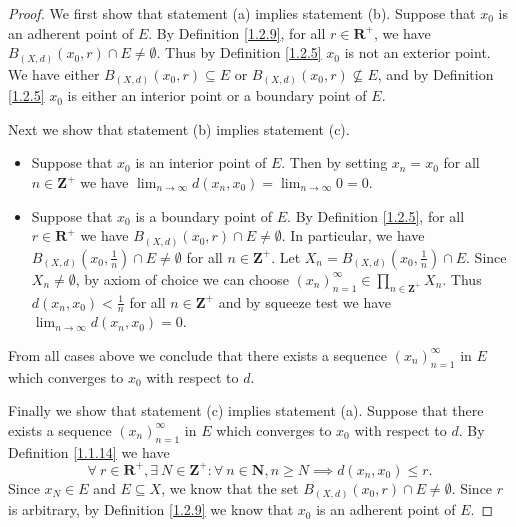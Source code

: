 \begin{proof}
    We first show that statement (a) implies statement (b).
    Suppose that \(x_0\) is an adherent point of \(E\).
    By Definition \ref{1.2.9}, for all \(r \in \mathbf{R}^+\), we have \(B_{(X, d)}(x_0, r) \cap E \neq \emptyset\).
    Thus by Definition \ref{1.2.5} \(x_0\) is not an exterior point.
    We have either \(B_{(X, d)}(x_0, r) \subseteq E\) or \(B_{(X, d)}(x_0, r) \not\subseteq E\), and by Definition \ref{1.2.5} \(x_0\) is either an interior point or a boundary point of \(E\).

    Next we show that statement (b) implies statement (c).
    \begin{itemize}
        \item Suppose that \(x_0\) is an interior point of \(E\).
              Then by setting \(x_n = x_0\) for all \(n \in \mathbf{Z}^+\) we have \(\lim_{n \to \infty} d(x_n, x_0) = \lim_{n \to \infty} 0 = 0\).
        \item Suppose that \(x_0\) is a boundary point of \(E\).
              By Definition \ref{1.2.5}, for all \(r \in \mathbf{R}^+\) we have \(B_{(X, d)}(x_0, r) \cap E \neq \emptyset\).
              In particular, we have \(B_{(X, d)}(x_0, \frac{1}{n}) \cap E \neq \emptyset\) for all \(n \in \mathbf{Z}^+\).
              Let \(X_n = B_{(X, d)}(x_0, \frac{1}{n}) \cap E\).
              Since \(X_n \neq \emptyset\), by axiom of choice we can choose \((x_n)_{n = 1}^\infty \in \prod_{n \in \mathbf{Z}^+} X_n\).
              Thus \(d(x_n, x_0) < \frac{1}{n}\) for all \(n \in \mathbf{Z}^+\) and by squeeze test we have \(\lim_{n \to \infty} d(x_n, x_0) = 0\).
    \end{itemize}
    From all cases above we conclude that there exists a sequence \((x_n)_{n = 1}^\infty\) in \(E\) which converges to \(x_0\) with respect to \(d\).

    Finally we show that statement (c) implies statement (a).
    Suppose that there exists a sequence \((x_n)_{n = 1}^\infty\) in \(E\) which converges to \(x_0\) with respect to \(d\).
    By Definition \ref{1.1.14} we have
    \[
        \forall\ r \in \mathbf{R}^+, \exists\ N \in \mathbf{Z}^+ : \forall\ n \in \mathbf{N}, n \geq N \implies d(x_n, x_0) \leq r.
    \]
    Since \(x_N \in E\) and \(E \subseteq X\), we know that the set \(B_{(X, d)}(x_0, r) \cap E \neq \emptyset\).
    Since \(r\) is arbitrary, by Definition \ref{1.2.9} we know that \(x_0\) is an adherent point of \(E\).
\end{proof}

